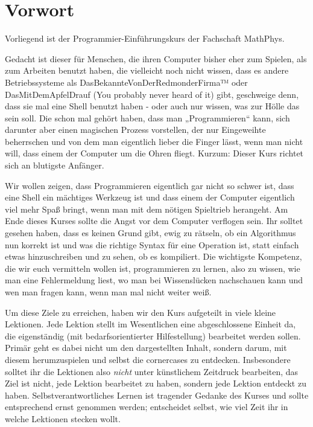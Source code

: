\documentclass{vorkurs}
\begin{document}
\chapter*{Vorwort}
\pagestyle{empty}

Vorliegend ist der Programmier-Einführungskurs der Fachschaft MathPhys.

Gedacht ist dieser für Menschen, die ihren Computer bisher eher zum Spielen, als zum Arbeiten benutzt haben, die vielleicht noch nicht wissen, dass es andere Betriebssysteme als DasBekannteVonDerRedmonderFirma™ oder DasMitDemApfelDrauf (You probably never heard of it) gibt, geschweige denn, dass sie mal eine Shell benutzt haben - oder auch nur wissen, was zur Hölle das sein soll.
Die schon mal gehört haben, dass man „Programmieren“ kann, sich darunter aber einen magischen Prozess vorstellen, der nur Eingeweihte beherrschen und von dem man eigentlich lieber die Finger lässt, wenn man nicht will, dass einem der Computer um die Ohren fliegt.
Kurzum: Dieser Kurs richtet sich an blutigste Anfänger.

Wir wollen zeigen, dass Programmieren eigentlich gar nicht so schwer ist, dass eine Shell ein mächtiges Werkzeug ist und dass einem der Computer eigentlich viel mehr Spaß bringt, wenn man mit dem nötigen Spieltrieb herangeht.
Am Ende dieses Kurses sollte die Angst vor dem Computer verflogen sein. Ihr solltet gesehen haben, dass es keinen Grund gibt, ewig zu rätseln, ob ein Algorithmus nun korrekt ist und was die richtige Syntax für eine Operation ist, statt einfach etwas hinzuschreiben und zu sehen, ob es kompiliert.
Die wichtigste Kompetenz, die wir euch vermitteln wollen ist, programmieren zu lernen, also zu wissen, wie man eine Fehlermeldung liest, wo man bei Wissenslücken nachschauen kann und wen man fragen kann, wenn man mal nicht weiter weiß.

Um diese Ziele zu erreichen, haben wir den Kurs aufgeteilt in viele kleine Lektionen. Jede Lektion stellt im Wesentlichen eine abgeschlossene Einheit da, die eigenständig (mit bedarfsorientierter Hilfestellung) bearbeitet werden sollen. Primär geht es dabei nicht um den dargestellten Inhalt, sondern darum, mit diesem herumzuspielen und selbst die cornercases zu entdecken.
Insbesondere solltet ihr die Lektionen also \emph{nicht} unter künstlichem Zeitdruck bearbeiten, das Ziel ist nicht, jede Lektion bearbeitet zu haben, sondern jede Lektion entdeckt zu haben.
Selbstverantwortliches Lernen ist tragender Gedanke des Kurses und sollte entsprechend ernst genommen werden; entscheidet selbst, wie viel Zeit ihr in welche Lektionen stecken wollt.
\end{document}
